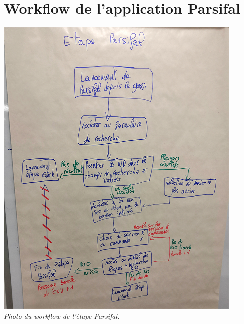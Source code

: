 \documentclass[a4paper,twoside,12pt]{report}
\begin{document}
\chapter{Workflow de l'application Parsifal}
\begin{center}
\includegraphics[height=15cm]{workflowParsifal.jpg}\\
\itshape Photo du workflow de l'étape Parsifal.
\end{center}
\end{document}
